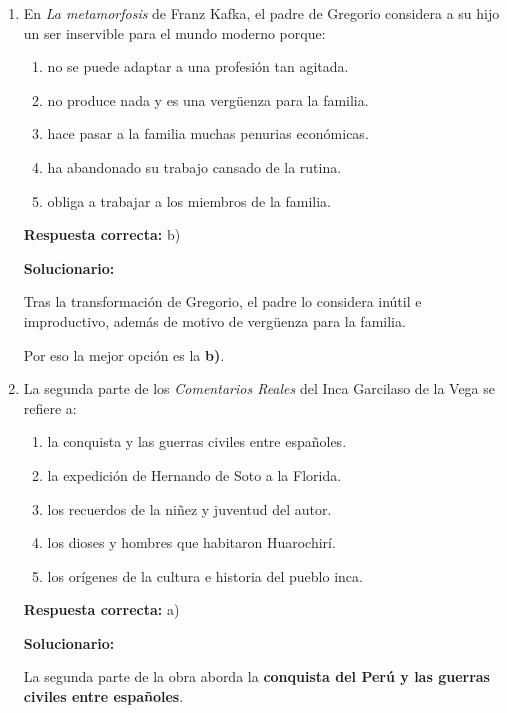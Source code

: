 \begin{enumerate}[resume]

	
	\item En \textit{La metamorfosis} de Franz Kafka, el padre de Gregorio considera a su hijo un ser inservible para el mundo moderno porque:
	\begin{enumerate}[label=\alph*)]
		\item no se puede adaptar a una profesión tan agitada.
		\item no produce nada y es una vergüenza para la familia.
		\item hace pasar a la familia muchas penurias económicas.
		\item ha abandonado su trabajo cansado de la rutina.
		\item obliga a trabajar a los miembros de la familia.
	\end{enumerate}
	\textbf{Respuesta correcta:} b)
	
	\vspace{2mm}
	\textbf{Solucionario:}
	
	Tras la transformación de Gregorio, el padre lo considera inútil e improductivo, además de motivo de vergüenza para la familia.
	
	Por eso la mejor opción es la \textbf{b)}.
	

	
	\vspace{6mm}
	
	\item La segunda parte de los \textit{Comentarios Reales} del Inca Garcilaso de la Vega se refiere a:
	\begin{enumerate}[label=\alph*)]
		\item la conquista y las guerras civiles entre españoles.
		\item la expedición de Hernando de Soto a la Florida.
		\item los recuerdos de la niñez y juventud del autor.
		\item los dioses y hombres que habitaron Huarochirí.
		\item los orígenes de la cultura e historia del pueblo inca.
	\end{enumerate}
	\textbf{Respuesta correcta:} a)
	
	\vspace{2mm}
	\textbf{Solucionario:}
	
	La segunda parte de la obra aborda la \textbf{conquista del Perú y las guerras civiles entre españoles}.
	


\end{enumerate}
